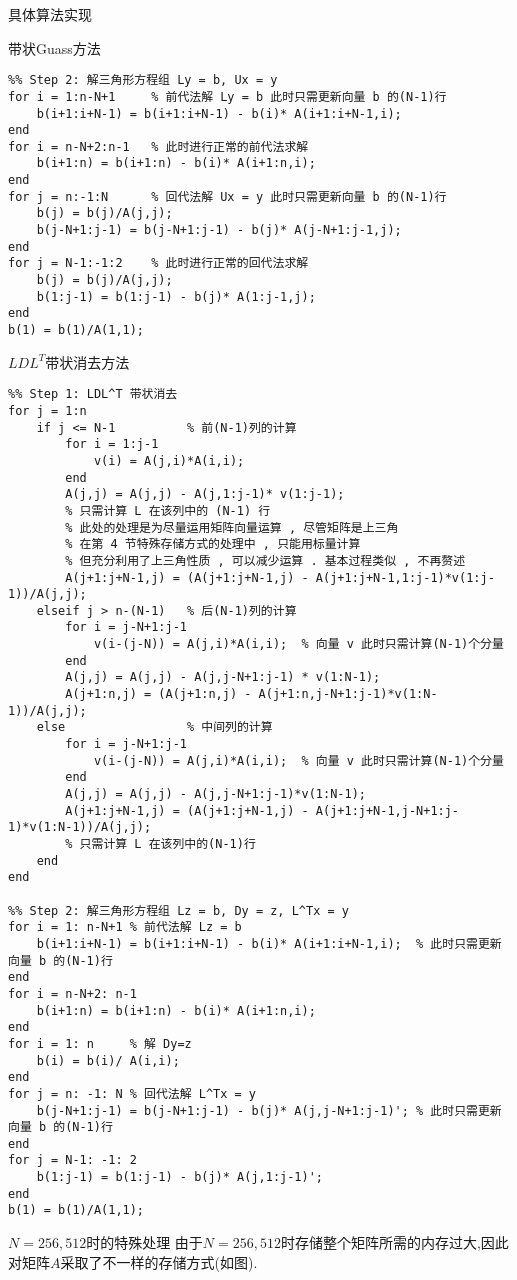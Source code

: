 \documentclass{article}
\begin{document}
\begin{section}{具体算法实现}
\begin{subsection}{带状Guass方法}
\begin{lstlisting}
%% Step 2: 解三角形方程组 Ly = b, Ux = y
for i = 1:n-N+1     % 前代法解 Ly = b 此时只需更新向量 b 的(N-1)行
    b(i+1:i+N-1) = b(i+1:i+N-1) - b(i)* A(i+1:i+N-1,i);
end
for i = n-N+2:n-1   % 此时进行正常的前代法求解
    b(i+1:n) = b(i+1:n) - b(i)* A(i+1:n,i);
end
for j = n:-1:N      % 回代法解 Ux = y 此时只需更新向量 b 的(N-1)行
    b(j) = b(j)/A(j,j);
    b(j-N+1:j-1) = b(j-N+1:j-1) - b(j)* A(j-N+1:j-1,j);
end
for j = N-1:-1:2    % 此时进行正常的回代法求解
    b(j) = b(j)/A(j,j);
    b(1:j-1) = b(1:j-1) - b(j)* A(1:j-1,j);
end
b(1) = b(1)/A(1,1);
        \end{lstlisting}
    \end{subsection}
    \begin{subsection}{$LDL^T$带状消去方法}
        \begin{lstlisting}
%% Step 1: LDL^T 带状消去
for j = 1:n
    if j <= N-1          % 前(N-1)列的计算
        for i = 1:j-1
            v(i) = A(j,i)*A(i,i);
        end
        A(j,j) = A(j,j) - A(j,1:j-1)* v(1:j-1);
        % 只需计算 L 在该列中的 (N-1) 行
        % 此处的处理是为尽量运用矩阵向量运算 , 尽管矩阵是上三角
        % 在第 4 节特殊存储方式的处理中 , 只能用标量计算
        % 但充分利用了上三角性质 , 可以减少运算 . 基本过程类似 , 不再赘述
        A(j+1:j+N-1,j) = (A(j+1:j+N-1,j) - A(j+1:j+N-1,1:j-1)*v(1:j-1))/A(j,j); 
    elseif j > n-(N-1)   % 后(N-1)列的计算
        for i = j-N+1:j-1
            v(i-(j-N)) = A(j,i)*A(i,i);  % 向量 v 此时只需计算(N-1)个分量
        end
        A(j,j) = A(j,j) - A(j,j-N+1:j-1) * v(1:N-1);
        A(j+1:n,j) = (A(j+1:n,j) - A(j+1:n,j-N+1:j-1)*v(1:N-1))/A(j,j); 
    else                 % 中间列的计算
        for i = j-N+1:j-1
            v(i-(j-N)) = A(j,i)*A(i,i);  % 向量 v 此时只需计算(N-1)个分量
        end
        A(j,j) = A(j,j) - A(j,j-N+1:j-1)*v(1:N-1);
        A(j+1:j+N-1,j) = (A(j+1:j+N-1,j) - A(j+1:j+N-1,j-N+1:j-1)*v(1:N-1))/A(j,j);
        % 只需计算 L 在该列中的(N-1)行
    end
end

%% Step 2: 解三角形方程组 Lz = b, Dy = z, L^Tx = y
for i = 1: n-N+1 % 前代法解 Lz = b
    b(i+1:i+N-1) = b(i+1:i+N-1) - b(i)* A(i+1:i+N-1,i);  % 此时只需更新向量 b 的(N-1)行
end
for i = n-N+2: n-1
    b(i+1:n) = b(i+1:n) - b(i)* A(i+1:n,i);
end
for i = 1: n     % 解 Dy=z
    b(i) = b(i)/ A(i,i);
end
for j = n: -1: N % 回代法解 L^Tx = y
    b(j-N+1:j-1) = b(j-N+1:j-1) - b(j)* A(j,j-N+1:j-1)'; % 此时只需更新向量 b 的(N-1)行
end
for j = N-1: -1: 2 
    b(1:j-1) = b(1:j-1) - b(j)* A(j,1:j-1)';
end
b(1) = b(1)/A(1,1);
        \end{lstlisting}
    \end{subsection}    
    \begin{subsection}{$N=256,512$时的特殊处理}
        由于$N=256,512$时存储整个矩阵所需的内存过大,因此对矩阵$A$采取了不一样的存储方式(如图).


\end{subsection}
\end{section}
\end{document}
